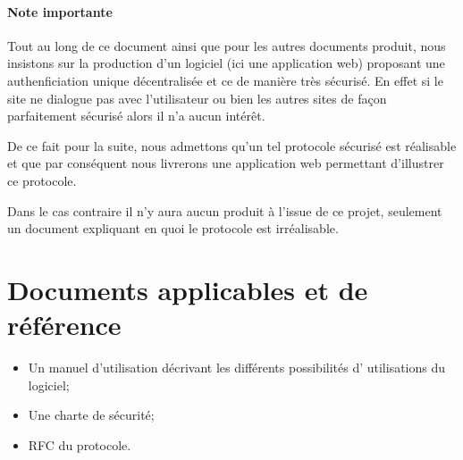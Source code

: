 \documentclass[a4paper,11pt,french]{article}
\begin{document}
\paragraph{Note importante}
Tout au long de ce document ainsi que pour les autres documents produit, nous
insistons sur la production d'un logiciel (ici une application web) proposant
une authenficiation unique décentralisée et ce de manière très sécurisé. En
effet si le site ne dialogue pas avec l'utilisateur ou bien les autres sites de
façon parfaitement sécurisé alors il n'a aucun intérêt. 

De ce fait pour la suite, nous admettons qu'un tel protocole sécurisé est
réalisable et que par conséquent nous livrerons une application web permettant
d'illustrer ce protocole. 

Dans le cas contraire il n'y aura aucun produit à l'issue de ce projet,
seulement un document expliquant en quoi le protocole est irréalisable.

\section{Documents applicables et de référence}
\begin{itemize}
\item Un manuel d'utilisation décrivant les différents possibilités d'
utilisations du logiciel;
\item Une charte de sécurité;
\item RFC du protocole.
\end{itemize}
\end{document}
